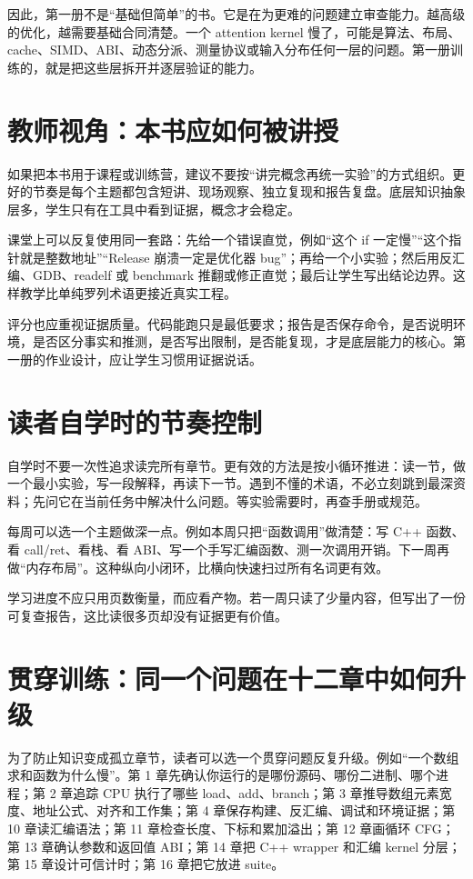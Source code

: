 因此，第一册不是“基础但简单”的书。它是在为更难的问题建立审查能力。越高级的优化，越需要基础合同清楚。一个 attention kernel 慢了，可能是算法、布局、cache、SIMD、ABI、动态分派、测量协议或输入分布任何一层的问题。第一册训练的，就是把这些层拆开并逐层验证的能力。

\section{教师视角：本书应如何被讲授}

如果把本书用于课程或训练营，建议不要按“讲完概念再统一实验”的方式组织。更好的节奏是每个主题都包含短讲、现场观察、独立复现和报告复盘。底层知识抽象层多，学生只有在工具中看到证据，概念才会稳定。

课堂上可以反复使用同一套路：先给一个错误直觉，例如“这个 if 一定慢”“这个指针就是整数地址”“Release 崩溃一定是优化器 bug”；再给一个小实验；然后用反汇编、GDB、readelf 或 benchmark 推翻或修正直觉；最后让学生写出结论边界。这样教学比单纯罗列术语更接近真实工程。

评分也应重视证据质量。代码能跑只是最低要求；报告是否保存命令，是否说明环境，是否区分事实和推测，是否写出限制，是否能复现，才是底层能力的核心。第一册的作业设计，应让学生习惯用证据说话。

\section{读者自学时的节奏控制}

自学时不要一次性追求读完所有章节。更有效的方法是按小循环推进：读一节，做一个最小实验，写一段解释，再读下一节。遇到不懂的术语，不必立刻跳到最深资料；先问它在当前任务中解决什么问题。等实验需要时，再查手册或规范。

每周可以选一个主题做深一点。例如本周只把“函数调用”做清楚：写 C++ 函数、看 call/ret、看栈、看 ABI、写一个手写汇编函数、测一次调用开销。下一周再做“内存布局”。这种纵向小闭环，比横向快速扫过所有名词更有效。

学习进度不应只用页数衡量，而应看产物。若一周只读了少量内容，但写出了一份可复查报告，这比读很多页却没有证据更有价值。

\section{贯穿训练：同一个问题在十二章中如何升级}

为了防止知识变成孤立章节，读者可以选一个贯穿问题反复升级。例如“一个数组求和函数为什么慢”。第 1 章先确认你运行的是哪份源码、哪份二进制、哪个进程；第 2 章追踪 CPU 执行了哪些 load、add、branch；第 3 章推导数组元素宽度、地址公式、对齐和工作集；第 4 章保存构建、反汇编、调试和环境证据；第 10 章读汇编语法；第 11 章检查长度、下标和累加溢出；第 12 章画循环 CFG；第 13 章确认参数和返回值 ABI；第 14 章把 C++ wrapper 和汇编 kernel 分层；第 15 章设计可信计时；第 16 章把它放进 suite。

